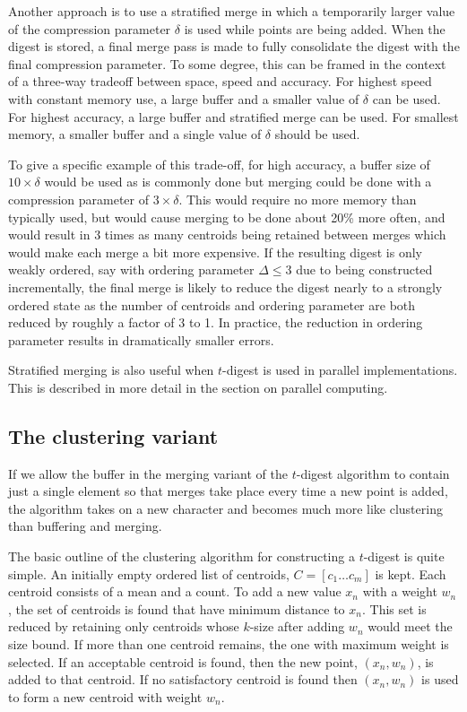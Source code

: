 \documentclass[]{statsoc}
\begin{document}
Another approach is to use a stratified merge in which a temporarily larger value of the compression parameter $\delta$ is used while points are being added. When the digest is stored, a final merge pass is made to fully consolidate the digest with the final compression parameter. To some degree, this can be framed in the context of a three-way tradeoff between space, speed and accuracy. For highest speed with constant memory use, a large buffer and a smaller value of $\delta$ can be used. For highest accuracy, a large buffer and stratified merge can be used. For smallest memory, a smaller buffer and a single value of $\delta$ should be used. 

To give a specific example of this trade-off, for high accuracy, a buffer size of $10\times\delta$ would be used as is commonly done but merging could be done with a compression parameter of $3\times\delta$. This would require no more memory than typically used, but would cause merging to be done about 20\% more often, and would result in 3 times as many centroids being retained between merges which would make each merge a bit more expensive. If the resulting digest is only weakly ordered, say with ordering parameter $\Delta \le 3$ due to being constructed incrementally, the final merge is likely to reduce the digest nearly to a strongly ordered state as the number of centroids and ordering parameter are both reduced by roughly a factor of 3 to 1. In practice, the reduction in ordering parameter results in dramatically smaller errors.

Stratified merging is also useful when $t$-digest is used in parallel implementations. This is described in more detail in the section on parallel computing.

\subsection{The clustering variant}
If we allow the buffer in the merging variant of the $t$-digest algorithm to contain just a single element so that merges take place every time a new point is added, the algorithm takes on a new character and becomes much more like clustering than buffering and merging.

The basic outline of the clustering algorithm for constructing a $t$-digest is quite simple.  An initially empty ordered list of centroids, $C = [ c_1 \ldots c_m ]$ is kept.  Each centroid consists of a mean and a count.  To add a new value $x_n$ with a weight $w_n$, the set of centroids is found that have minimum distance to $x_n$.  This set is reduced by retaining only centroids whose $k$-size after adding $w_n$ would meet the size bound.  If more than one centroid remains, the one with maximum weight is selected.  If an acceptable centroid is found, then the new point, $(x_n,w_n)$, is added to that centroid. If no satisfactory centroid is found then $(x_n,w_n)$ is used to form a new centroid with weight $w_n$.
\end{document}
